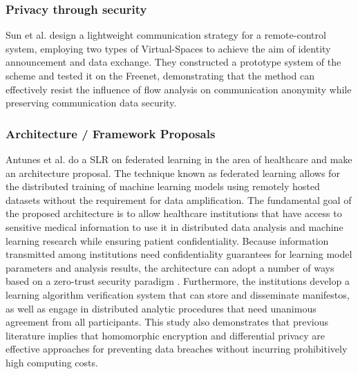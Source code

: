 \documentclass[conference]{IEEEtran}
\begin{document}
\subsubsection{Privacy through security}

Sun et al. \cite{SunSecure} design a lightweight communication strategy for
a remote-control system, employing two types of Virtual-Spaces to achieve
the aim of identity announcement and data exchange. They constructed a prototype
system of the scheme and tested it on the Freenet, demonstrating that the
method can effectively resist the influence of flow analysis on communication
anonymity while preserving communication data security.

\subsubsection{Architecture / Framework Proposals}

Antunes et al. \cite{AntunesFederated} do a SLR on federated learning in
the area of healthcare and make an architecture proposal. The technique known
as federated learning allows for the distributed training of machine learning
models using remotely hosted datasets without the requirement for data amplification.
The fundamental goal of the proposed architecture is to allow healthcare
institutions that have access to sensitive medical information to use it
in distributed data analysis and machine learning research while ensuring
patient confidentiality. Because information transmitted among institutions
need confidentiality guarantees for learning model parameters and analysis
results, the architecture can adopt a number of ways based on a zero-trust
security paradigm \cite{ChenSecurity}. Furthermore, the institutions develop
a learning algorithm verification system that can store and disseminate manifestos,
as well as engage in distributed analytic procedures that need unanimous
agreement from all participants. This study also demonstrates that previous
literature implies that homomorphic encryption and differential privacy are
effective approaches for preventing data breaches without incurring prohibitively
high computing costs.

\end{document}
